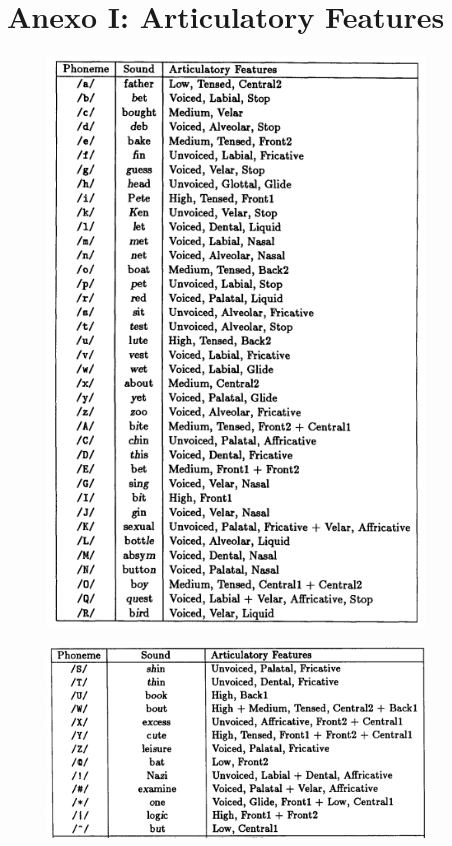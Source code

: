 \documentclass[paper=a4, fontsize=11pt]{scrartcl} %
\numberwithin{equation}{section} %
\numberwithin{figure}{section} %
\numberwithin{table}{section} %
\begin{document}
\newpage

\section { Anexo I: Articulatory Features}


\begin{center}
\begin{figure}[h!]
\centering
\includegraphics[width=100mm]{imgs/art_features.jpg}
\end{figure}
\end{center}

\begin{center}
\begin{figure}[h!]
\centering

\includegraphics[width=100mm]{imgs/art_features2.jpg}
\end{figure}
\end{center}
\end{document}
